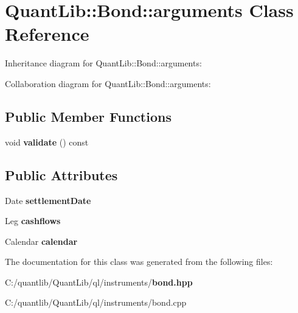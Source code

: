 \section{Quant\+Lib\+:\+:Bond\+:\+:arguments Class Reference}
\label{class_quant_lib_1_1_bond_1_1arguments}


Inheritance diagram for Quant\+Lib\+:\+:Bond\+:\+:arguments\+:


Collaboration diagram for Quant\+Lib\+:\+:Bond\+:\+:arguments\+:
\subsection*{Public Member Functions}
\begin{DoxyCompactItemize}
\item 
void {\bfseries validate} () const \label{class_quant_lib_1_1_bond_1_1arguments_a5ea9d8696aaa15766916f3ceecfd8dff}

\end{DoxyCompactItemize}
\subsection*{Public Attributes}
\begin{DoxyCompactItemize}
\item 
Date {\bfseries settlement\+Date}\label{class_quant_lib_1_1_bond_1_1arguments_afc60169afc05794edf0186b5f2bee02e}

\item 
Leg {\bfseries cashflows}\label{class_quant_lib_1_1_bond_1_1arguments_a3f32d46365b59f912fe490aa61a6e75c}

\item 
Calendar {\bfseries calendar}\label{class_quant_lib_1_1_bond_1_1arguments_aa1760f8a00d951eb15dd8c6b35f45fce}

\end{DoxyCompactItemize}


The documentation for this class was generated from the following files\+:\begin{DoxyCompactItemize}
\item 
C\+:/quantlib/\+Quant\+Lib/ql/instruments/{\bf bond.\+hpp}\item 
C\+:/quantlib/\+Quant\+Lib/ql/instruments/bond.\+cpp\end{DoxyCompactItemize}
